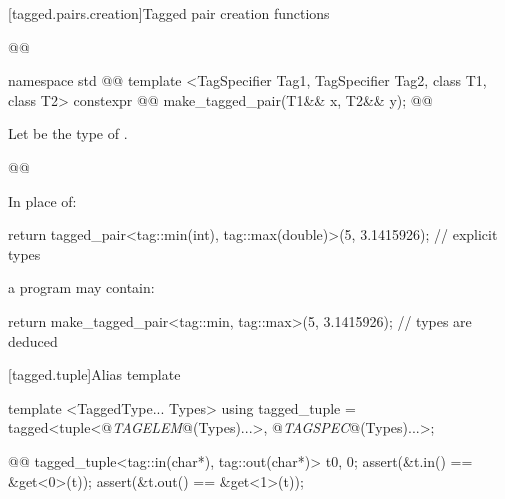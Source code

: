 {[tagged.pairs.creation]{Tagged pair creation functions}

%
\begin{itemdecl}
@@

namespace std { @@
  template <TagSpecifier Tag1, TagSpecifier Tag2, class T1, class T2>
    constexpr @\oldtxt{\seebelow}@ make_tagged_pair(T1&& x, T2&& y);
}@\oldtxt{\}\}\}}@
\end{itemdecl}

\begin{itemdescr}
\pnum
Let  be the type of .

\pnum
{}

\pnum
{}
\begin{codeblock}
@@
\end{codeblock}

\pnum
\enterexample
In place of:

\begin{codeblock}
  return tagged_pair<tag::min(int), tag::max(double)>(5, 3.1415926);   // explicit types
\end{codeblock}

a \Cpp program may contain:

\begin{codeblock}
  return make_tagged_pair<tag::min, tag::max>(5, 3.1415926);           // types are deduced
\end{codeblock}
\exitexample
\end{itemdescr}

[tagged.tuple]{Alias template }

\pnum
\begin{codeblock}
template <TaggedType... Types>
using tagged_tuple = tagged<tuple<@\textit{TAGELEM}@(Types)...>,
                            @\textit{TAGSPEC}@(Types)...>;
\end{codeblock}

\pnum
\enterexample
\begin{codeblock}
@@
tagged_tuple<tag::in(char*), tag::out(char*)> t{0, 0};
assert(&t.in() == &get<0>(t));
assert(&t.out() == &get<1>(t));
\end{codeblock}
\exitexample

}
